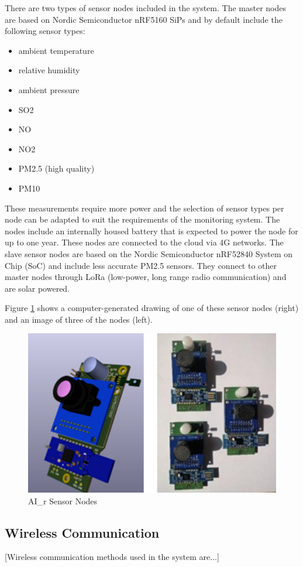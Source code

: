 \documentclass[a4paper,twoside,12pt]{report}
\begin{document}
\newline
There are two types of sensor nodes included in the system. The master nodes are based on Nordic Semiconductor nRF5160 SiPs and by default include the following sensor types:
\begin{itemize}
    \item ambient temperature
    \item relative humidity
    \item ambient pressure
    \item SO2
    \item NO
    \item NO2
    \item PM2.5 (high quality)
    \item PM10
\end{itemize}
These measurements require more power and the selection of sensor types per node can be adapted to suit the requirements of the monitoring system. The nodes include an internally housed battery that is expected to power the node for up to one year. These nodes are connected to the cloud via 4G networks.
\newline
The slave sensor nodes are based on the Nordic Semiconductor nRF52840 System on Chip (SoC) and include less accurate PM2.5 sensors. They connect to other master nodes through LoRa (low-power, long range radio communication) and are solar powered.
\newline 

Figure \ref{fig:SensorNodes} shows a computer-generated drawing of one of these sensor nodes (right) and an image of three of the nodes (left).

\begin{figure}[ht]
	\centering
	\includegraphics[width=0.5\linewidth]{images/SensorNodes.png}
	\caption{AI\_r Sensor Nodes}
	\label{fig:SensorNodes}
\end{figure}


\subsection{Wireless Communication}
[Wireless communication methods used in the system are...]
\end{document}
